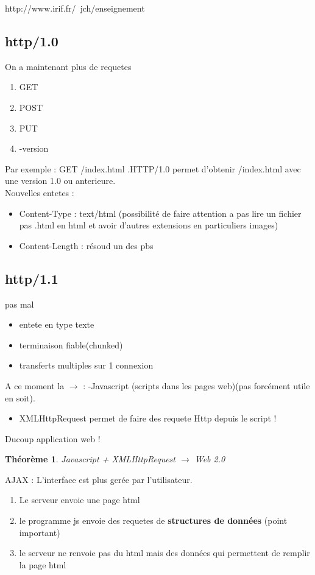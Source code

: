\documentclass[12pt]{article}
\theoremstyle{plain}
\newtheorem{thm}[subsubsection]{Th\'eor\`eme}
\theoremstyle{definition}
\theoremstyle{remark}
\begin{document}
{\color{blue}http}:{\color{Green}//www.irif.fr/}{\color{red}~jch/enseignement}


\subsection{http/1.0}
On a maintenant plus de requetes
\begin{enumerate}
    \item GET
    \item POST
    \item PUT
    \item -version
\end{enumerate}

Par exemple : GET /index.html .HTTP/1.0 permet d'obtenir /index.html avec une version 1.0 ou anterieure.\\
Nouvelles entetes :
\begin{itemize}
    \item Content-Type : text/html (possibilité de faire attention a pas lire un fichier pas .html en html et avoir d'autres extensions en particuliers images)
    \item Content-Length : résoud un des pbs
\end{itemize}

\subsection{http/1.1}
pas mal
\begin{itemize}
    \item entete en type texte
    \item terminaison fiable(chunked)
    \item transferts multiples sur 1 connexion
\end{itemize}

A ce moment la $\rightarrow$ : -Javascript (scripts dans les pages web)(pas forcément utile en soit).\\
\begin{itemize}
    \item XMLHttpRequest permet de faire des requete Http depuis le script !
\end{itemize}

Ducoup application web !
\begin{thm}
    Javascript + XMLHttpRequest $\rightarrow$ Web 2.0
\end{thm}

AJAX : L'interface est plus gerée par l'utilisateur.
\begin{enumerate}
    \item Le serveur envoie une page html
    \item le programme js envoie des requetes de \textbf{structures de données} (point important)
    \item le serveur ne renvoie pas du html mais des données qui permettent de remplir la page html
\end{enumerate}
\end{document}
